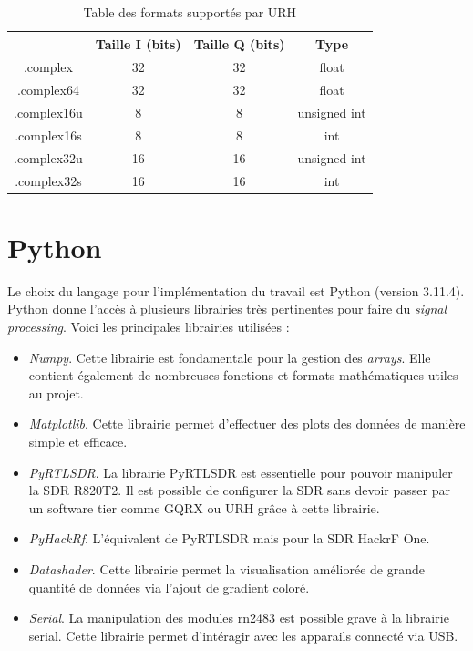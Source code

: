 \begin{table}[h]
\centering
\begin{adjustbox}{width=1\textwidth}
\begin{tabular}{|c|c|c|c|}
\hline
\multicolumn{1}{|c|}{} & \multicolumn{1}{c|}{Taille I (bits)} &\multicolumn{1}{c|}{Taille Q (bits)} & \multicolumn{1}{c|}{Type}\\
\hline
.complex & 32 & 32 & float \\
\hline
.complex64 & 32 & 32 & float\\
\hline
.complex16u & 8 & 8 & unsigned int\\
\hline
.complex16s &  8 & 8 & int\\
\hline
.complex32u & 16 & 16 & unsigned int \\
\hline
.complex32s & 16 & 16 & int  \\
\hline
\end{tabular}
\end{adjustbox}
\caption{Table des formats supportés par URH}
\label{format}
\end{table}



\section{Python}

Le choix du langage pour l'implémentation du travail est Python (version 3.11.4). Python donne l'accès à plusieurs librairies très pertinentes pour faire du \textit{signal processing}. Voici les principales librairies utilisées :

\vspace{0.1cm}

\begin{itemize}
\item \textit{Numpy}. Cette librairie est fondamentale pour la gestion des \textit{arrays}. Elle contient également de nombreuses fonctions et formats mathématiques utiles au projet.
\item \textit{Matplotlib}. Cette librairie permet d'effectuer des plots des données de manière simple et efficace.
\item \textit{PyRTLSDR}. La librairie PyRTLSDR est essentielle pour pouvoir manipuler la SDR R820T2. Il est possible de configurer la SDR sans devoir passer par un software tier comme GQRX ou URH grâce à cette librairie.
\item \textit{PyHackRf}. L'équivalent de PyRTLSDR mais pour la SDR HackrF One.
\item \textit{Datashader}. Cette librairie permet la visualisation améliorée de grande quantité de données via l'ajout de gradient coloré.
\item \textit{Serial}. La manipulation des modules rn2483 est possible grave à la librairie serial. Cette librairie permet d'intéragir avec les apparails connecté via USB.
\end{itemize}

